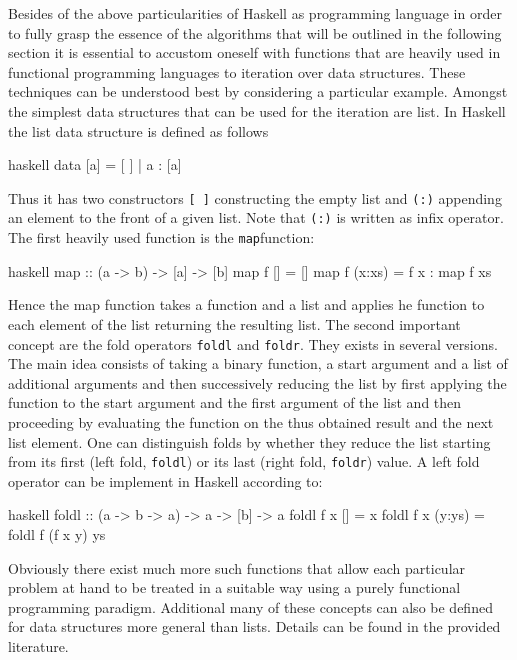 \documentclass[a4paper,12pt, DIV=14, BCOR=5mm, twoside, headsepline, numbers=noenddot]{scrbook}
\begin{document}
Besides of the above particularities of Haskell as programming language in order to fully grasp the essence of the algorithms that will be outlined in the following section it is essential to accustom oneself with functions that are heavily used in functional programming languages to iteration over data structures. These techniques can be understood best by considering a particular example. Amongst the simplest data structures that can be used for the iteration are list. In Haskell the list data structure is defined as follows 
\begin{center}
\begin{cminted}{haskell}
data [a] = [ ] | a : [a] 
\end{cminted}
\end{center}
Thus it has two constructors \texttt{[ ]} constructing the empty list and \texttt{(:)} appending an element to the front of a given list. Note that \texttt{(:)} is written as infix operator.
The first heavily used function is the \texttt{map}function:
\begin{center}
\begin{cminted}{haskell}
map :: (a -> b) -> [a] -> [b]
map f [] = [] 
map f (x:xs) =  f x : map f xs 
\end{cminted}
\end{center}
Hence the map function takes a function and a list and applies he function to each element of the list returning the resulting list. The second important concept are the fold operators \texttt{foldl} and \texttt{foldr}. They exists in several versions. The main idea consists of taking a binary function, a start argument and a list of additional arguments and then successively reducing the list by first applying the function to the start argument and the first argument of the list and then proceeding by evaluating the function on the thus obtained result and the next list element. One can distinguish folds by whether they reduce the list starting from its first (left fold, \texttt{foldl}) or its last (right fold, \texttt{foldr}) value. A left fold operator can be implement in Haskell according to:
\begin{center}
\begin{cminted}{haskell}
foldl :: (a -> b -> a) -> a -> [b] -> a 
foldl f x [] = x 
foldl f x (y:ys) = foldl f (f x y) ys
\end{cminted}
\end{center}
Obviously there exist much more such functions that allow each particular problem at hand to be treated in a suitable way using a purely functional programming paradigm. Additional many of these concepts can also be defined for data structures more general than lists. Details can be found in the provided literature.
\end{document}
